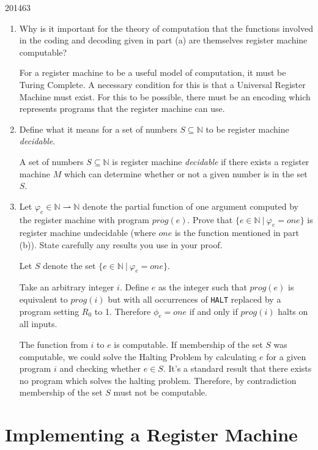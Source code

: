 \documentclass[10pt,\jkfside,a4paper]{article}
\begin{document}
\begin{examquestion}{2014}{6}{3}
\begin{enumerate}
Therefore, the integer representation of the program $prog$ under this
encoding is 3.

\item Why is it important for the theory of computation that the functions
involved in the coding and decoding given in part (a) are themselves
register machine computable?

For a register machine to be a useful model of computation, it must be
Turing Complete. A necessary condition for this is that a Universal Register
Machine must exist. For this to be possible, there must be an encoding which
represents programs that the register machine can use.

\item Define what it means for a set of numbers $ S \subseteq \mathbb{N} $
to be register machine \textit{decidable}.

A set of numbers $S \subseteq \mathbb{N}$ is register machine
\textit{decidable} if there exists a register machine $M$ which can
determine whether or not a given number is in the set $S$.

\item Let $\varphi_e \in \mathbb{N} \rightharpoonup \mathbb{N}$ denote the
partial function of one argument computed by the register machine with
program $prog(e)$. Prove that $\{e \in \mathbb{N} \ | \ \varphi_e = one\}$
is register machine undecidable (where $one$ is the function mentioned in
part (b)). State carefully any results you use in your proof.

Let $S$ denote the set $\{e \in \mathbb{N} \ | \ \varphi_e = one\}$.

Take an arbitrary integer $i$. Define $e$ as the integer such that $prog(e)$
is equivalent to $prog(i)$ but with all occurrences of \texttt{HALT}
replaced by a program setting $R_0$ to 1. Therefore $\phi_e = one$ if and
only if $prog(i)$ halts on all inputs.

The function from $i$ to $e$ is computable. If membership of the set $S$ was
computable, we could solve the Halting Problem by calculating $e$ for a
given program $i$ and checking whether $e \in S$. It's a standard result that
there exists no program which solves the halting problem. Therefore, by
contradiction membership of the set $S$ must not be computable.

\end{enumerate}

\end{examquestion}

\section{Implementing a Register Machine}
\end{document}
